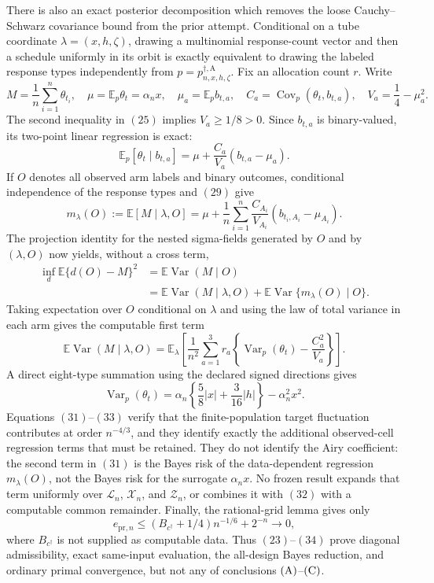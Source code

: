 There is also an exact posterior decomposition which removes the loose
Cauchy--Schwarz covariance bound from the prior attempt.  Conditional on a
tube coordinate \(\lambda=(x,h,\zeta)\), drawing a multinomial response-count
vector and then a schedule uniformly in its orbit is exactly equivalent to
drawing the labeled response types independently from
\(p=p_{n,x,h,\zeta}^{\dagger,\mathrm A}\).  Fix an allocation count \(r\).
Write
\[
 M=\frac1n\sum_{i=1}^n\theta_{t_i},
 \quad
 \mu=\mathbb E_p\theta_t=\alpha_nx,
 \quad
 \mu_a=\mathbb E_pb_{t,a},
 \quad
 C_a=\operatorname{Cov}_p(\theta_t,b_{t,a}),
 \quad
 V_a=\frac14-\mu_a^2.                                      \tag{28}
\]
The second inequality in \((25)\) implies \(V_a\ge1/8>0\).  Since
\(b_{t,a}\) is binary-valued, its two-point linear regression is exact:
\[
 \mathbb E_p[\theta_t\mid b_{t,a}]
 =\mu+\frac{C_a}{V_a}(b_{t,a}-\mu_a).                        \tag{29}
\]
If \(O\) denotes all observed arm labels and binary outcomes, conditional
independence of the response types and \((29)\) give
\[
 m_\lambda(O):=\mathbb E[M\mid\lambda,O]
 =\mu+\frac1n\sum_{i=1}^n
 \frac{C_{A_i}}{V_{A_i}}(b_{t_i,A_i}-\mu_{A_i}).             \tag{30}
\]
The projection identity for the nested sigma-fields generated by \(O\) and
by \((\lambda,O)\) now yields, without a cross term,
\[
\begin{aligned}
 \inf_d\mathbb E\{d(O)-M\}^2
 &=\mathbb E\operatorname{Var}(M\mid O)\\
 &=\mathbb E\operatorname{Var}(M\mid\lambda,O)
   +\mathbb E\operatorname{Var}\{m_\lambda(O)\mid O\}.      \tag{31}
\end{aligned}
\]
Taking expectation over \(O\) conditional on \(\lambda\) and using the law
of total variance in each arm gives the computable first term
\[
 \mathbb E\operatorname{Var}(M\mid\lambda,O)
 =\mathbb E_\lambda\!\left[
 \frac1{n^2}\sum_{a=1}^3r_a
 \left\{\operatorname{Var}_p(\theta_t)-\frac{C_a^2}{V_a}\right\}
 \right].                                                   \tag{32}
\]
A direct eight-type summation using the declared signed directions gives
\[
 \operatorname{Var}_p(\theta_t)
 =\alpha_n\left\{\frac58|x|+\frac3{16}|h|\right\}
  -\alpha_n^2x^2.                                           \tag{33}
\]
Equations \((31)\)--\((33)\) verify that the finite-population target
fluctuation contributes at order \(n^{-4/3}\), and they identify exactly the
additional observed-cell regression terms that must be retained.  They do not
identify the Airy coefficient: the second term in \((31)\) is the Bayes risk
of the data-dependent regression \(m_\lambda(O)\), not the Bayes risk for the
surrogate \(\alpha_nx\).  No frozen result expands that term uniformly over
\(\mathcal L_n\), \(\mathcal X_n\), and \(\mathcal Z_n\), or combines it with
\((32)\) with a computable common remainder.  Finally, the rational-grid
lemma gives only
\[
 e_{\mathrm{pr},n}
 \le(B_{c^\dagger}+1/4)n^{-1/6}+2^{-n}\longrightarrow0,      \tag{34}
\]
where \(B_{c^\dagger}\) is not supplied as computable data.  Thus
\((23)\)--\((34)\) prove diagonal admissibility, exact same-input evaluation,
the all-design Bayes reduction, and ordinary primal convergence, but not any
of conclusions \({\rm(A)}\)--\({\rm(C)}\).
